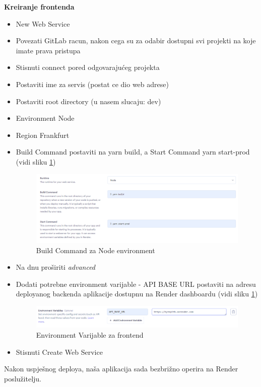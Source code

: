 \begin{packed_enum}
				\item \textbf{Kreiranje frontenda}
				\begin{itemize}
					\item New \textrightarrow Web Service
					\item Povezati GitLab racun, nakon cega su za odabir dostupni svi projekti na koje imate prava pristupa
					\item Stisnuti connect pored odgovarajućeg projekta
					\item Postaviti ime za servis (postat ce dio web adrese)
					\item Postaviti root directory (u nasem slucaju: dev)
					\item Environment Node
					\item Region Frankfurt
					\item Build Command postaviti na yarn build, a Start Command yarn start-prod (vidi sliku \ref{fig:BuildComand})
					\begin{figure}[H]
						\includegraphics[scale=0.5]{slike/BuildComand}
						\centering
						\caption{Build Command za Node environment}
						\label{fig:BuildComand}
					\end{figure}	
					\item Na dnu proširiti \textit{advanced}
					\item Dodati potrebne environment varijable - API BASE URL postaviti na adresu deployanog backenda aplikacije dostupnu na Render dashboardu (vidi sliku \ref{fig:BuildComand})
						\begin{figure}[H]
							\includegraphics[scale=0.5]{slike/EnvironmentVarijableFront}
							\centering
							\caption{Environment Varijable za frontend }
							\label{fig:EnvVarfront}
						\end{figure}
					\item Stisnuti Create Web Service
				\end{itemize}
			\end{packed_enum}
			
			Nakon uspješnog deploya, naša aplikacija sada bezbrižno operira na Render poslužitelju.
		
			
			
			